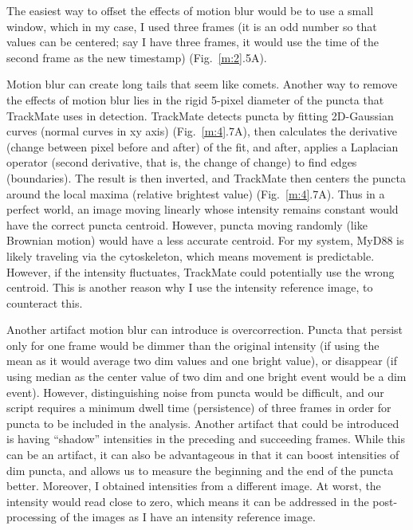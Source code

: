 The easiest way to offset the effects of motion blur would be to use a small window, which in my case, I used three frames (it is an odd number so that values can be centered; say I have three frames, it would use the time of the second frame as the new timestamp) (Fig.~\ref{m:2}.5A).

Motion blur can create long tails that seem like comets. Another way to remove the effects of motion blur lies in the rigid 5-pixel diameter of the puncta that TrackMate uses in detection. TrackMate detects puncta by fitting 2D-Gaussian curves (normal curves in xy axis) (Fig.~\ref{m:4}.7A), then calculates the derivative (change between pixel before and after) of the fit, and after, applies a Laplacian operator (second derivative, that is, the change of change) to find edges (boundaries). The result is then inverted, and TrackMate then centers the puncta around the local maxima (relative brightest value) (Fig.~\ref{m:4}.7A). Thus in a perfect world, an image moving linearly whose intensity remains constant would have the correct puncta centroid. However, puncta moving randomly (like Brownian motion) would have a less accurate centroid. For my system, MyD88 is likely traveling via the cytoskeleton, which means movement is predictable. However, if the intensity fluctuates, TrackMate could potentially use the wrong centroid. This is another reason why I use the intensity reference image, to counteract this.

Another artifact motion blur can introduce is overcorrection. Puncta that persist only for one frame would be dimmer than the original intensity (if using the mean as it would average two dim values and one bright value), or disappear (if using median as the center value of two dim and one bright event would be a dim event). However, distinguishing noise from puncta would be difficult, and our script requires a minimum dwell time (persistence) of three frames in order for puncta to be included in the analysis. Another artifact that could be introduced is having “shadow” intensities in the preceding and succeeding frames. While this can be an artifact, it can also be advantageous in that it can boost intensities of dim puncta, and allows us to measure the beginning and the end of the puncta better. Moreover, I obtained intensities from a different image. At worst, the intensity would read close to zero, which means it can be addressed in the post-processing of the images as I have an intensity reference image.


